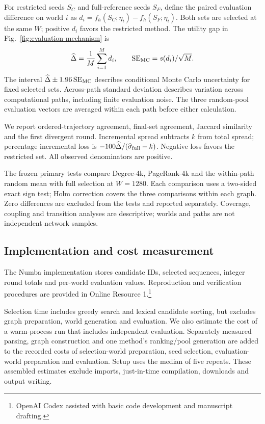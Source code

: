 \documentclass[smallextended]{svjour3}
\begin{document}
For restricted seeds $S_C$ and full-reference seeds $S_F$, define the paired evaluation difference on world $i$ as $d_i=f_h(S_C;\eta_i)-f_h(S_F;\eta_i)$. Both sets are selected at the same $W$; positive $d_i$ favors the restricted method. The utility gap in Fig.~\ref{fig:evaluation-mechanism} is
\begin{equation}
\widehat\Delta=\frac{1}{M}\sum_{i=1}^{M}d_i,
\qquad \operatorname{SE}_{\rm MC}=s(d_i)/\sqrt M.
\end{equation}
The interval $\widehat\Delta\pm1.96\operatorname{SE}_{\rm MC}$ describes conditional Monte Carlo uncertainty for fixed selected sets. Across-path standard deviation describes variation across computational paths, including finite evaluation noise. The three random-pool evaluation vectors are averaged within each path before either calculation.

We report ordered-trajectory agreement, final-set agreement, Jaccard similarity and the first divergent round. Incremental spread subtracts $k$ from total spread; percentage incremental loss is $-100\widehat\Delta/(\widehat\sigma_{\rm full}-k)$. Negative loss favors the restricted set. All observed denominators are positive.

The frozen primary tests compare Degree-4k, PageRank-4k and the within-path random mean with full selection at $W=1280$. Each comparison uses a two-sided exact sign test; Holm correction covers the three comparisons within each graph. Zero differences are excluded from the tests and reported separately. Coverage, coupling and transition analyses are descriptive; worlds and paths are not independent network samples.

\subsection{Implementation and cost measurement}
The Numba implementation stores candidate IDs, selected sequences, integer round totals and per-world evaluation values. Reproduction and verification procedures are provided in Online Resource 1.\footnote{OpenAI Codex assisted with basic code development and manuscript drafting.}

Selection time includes greedy search and lexical candidate sorting, but excludes graph preparation, world generation and evaluation. We also estimate the cost of a warm-process run that includes independent evaluation. Separately measured parsing, graph construction and one method's ranking/pool generation are added to the recorded costs of selection-world preparation, seed selection, evaluation-world preparation and evaluation. Setup uses the median of five repeats. These assembled estimates exclude imports, just-in-time compilation, downloads and output writing.
\end{document}
